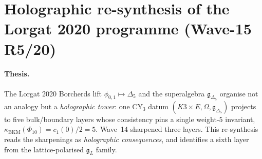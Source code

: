 
\providecommand{\ClaimStatusTheorem}{\textsc{[theorem]}}
\providecommand{\ClaimStatusConjectured}{\textsc{[conjectural]}}
\providecommand{\ClaimStatusHeuristic}{\textsc{[heuristic]}}
\providecommand{\kch}{\kappa_{\mathrm{ch}}}
\providecommand{\kcat}{\kappa_{\mathrm{cat}}}
\providecommand{\kBKM}{\kappa_{\mathrm{BKM}}}
\providecommand{\kfib}{\kappa_{\mathrm{fiber}}}
\providecommand{\kanom}{\kappa_{\mathrm{anom}}}
\providecommand{\hCS}{\mathrm{hCS}}
\providecommand{\Obs}{\mathrm{Obs}}
\providecommand{\HH}{\mathrm{HH}}
\providecommand{\Yaff}{Y_{\epsilon_1,\epsilon_2,\epsilon_3}}
\providecommand{\gghone}{\widehat{\mathfrak{gl}}_1}
\providecommand{\gBKM}{\mathfrak{g}_{\Delta_5}}
\providecommand{\gL}{\mathfrak{g}_{L}}
\providecommand{\CoHA}{\mathrm{CoHA}}
\providecommand{\Phiten}{\Phi_{10}}
\providecommand{\Deltafive}{\Delta_{5}}
\providecommand{\C}{\mathbb{C}}
\providecommand{\R}{\mathbb{R}}
\providecommand{\Z}{\mathbb{Z}}
\providecommand{\cO}{\mathcal{O}}
\providecommand{\cS}{\mathcal{S}}
\providecommand{\cT}{\mathcal{T}}
\providecommand{\cV}{\mathcal{V}}
\providecommand{\cM}{\mathcal{M}}
\providecommand{\fe}{\mathfrak{e}}
\providecommand{\fsl}{\mathfrak{sl}}
\providecommand{\AdS}{\mathrm{AdS}}
\providecommand{\BH}{\mathrm{BH}}
\providecommand{\Sthree}{\mathfrak{S}_{3}}
\providecommand{\Sph}{\Sigma_{0,24}}

\section*{Holographic re-synthesis of the Lorgat 2020 programme
  (Wave-15 R5/20)}
\label{sec:wave15-r5-holo-resynthesis}

\paragraph{Thesis.}
The Lorgat 2020 Borcherds lift $\phi_{0,1}\mapsto\Deltafive$ and the
superalgebra $\gBKM$ organise not an analogy but a \emph{holographic
tower}: one CY$_3$ datum $(K3\times E,\Omega,\gBKM)$ projects to five
bulk/boundary layers whose consistency pins a single weight-$5$
invariant, $\kBKM(\Phiten)=c_1(0)/2=5$.  Wave~14 sharpened three
layers.  This re-synthesis reads the sharpenings as \emph{holographic
consequences}, and identifies a sixth layer from the lattice-polarised
$\gL$ family.

